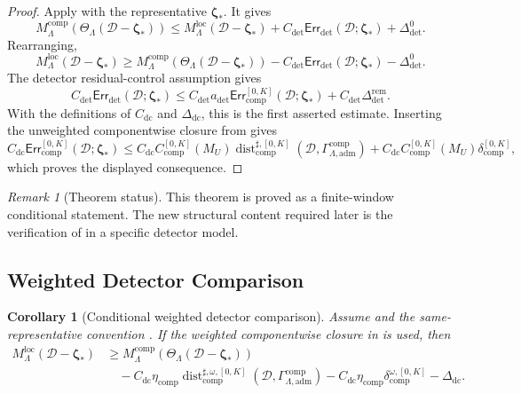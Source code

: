 \documentclass[11pt]{article}
\numberwithin{equation}{section}
\newtheorem{corollary}[corollary]{Corollary}
\theoremstyle{definition}
\theoremstyle{remark}
\newtheorem{remark}[remark]{Remark}
\newcommand{\loc}{\mathrm{loc}}
\newcommand{\adm}{\mathrm{adm}}
\newcommand{\comp}{\mathrm{comp}}
\newcommand{\detc}{\mathrm{det}}
\newcommand{\Err}{\mathsf{Err}}
\newcommand{\Dist}{\operatorname{dist}}
\newcommand{\calD}{\mathcal D}
\newcommand{\bzeta}{\boldsymbol\zeta}
\newcommand{\Gcomp}{\Gamma_{\Lambda,\adm}^{\comp}}
\begin{document}
\begin{proof}
Apply  with the representative \(\bzeta_*\).  It
gives
\[
    M_{\Lambda}^{\comp}(\Theta_{\Lambda}(\calD-\bzeta_*))
    \le
    M_{\Lambda}^{\loc}(\calD-\bzeta_*)
    +
    C_{\detc}\Err_{\detc}(\calD;\bzeta_*)
    +
    \Delta_{\detc}^{0}.
\]
Rearranging,
\[
    M_{\Lambda}^{\loc}(\calD-\bzeta_*)
    \ge
    M_{\Lambda}^{\comp}(\Theta_{\Lambda}(\calD-\bzeta_*))
    -
    C_{\detc}\Err_{\detc}(\calD;\bzeta_*)
    -
    \Delta_{\detc}^{0}.
\]
The detector residual-control assumption gives
\[
    C_{\detc}\Err_{\detc}(\calD;\bzeta_*)
    \le
    C_{\detc}a_{\detc}\Err_{\comp}^{[0,K]}(\calD;\bzeta_*)
    +
    C_{\detc}\Delta_{\detc}^{\mathrm{rem}}.
\]
With the definitions of \(C_{\mathrm{dc}}\) and \(\Delta_{\mathrm{dc}}\), this is
the first asserted estimate.  Inserting the unweighted componentwise closure
from  gives
\[
    C_{\mathrm{dc}}\Err_{\comp}^{[0,K]}(\calD;\bzeta_*)
    \le
    C_{\mathrm{dc}}C_{\comp}^{[0,K]}(M_U)
    \Dist_{\comp}^{\sharp,[0,K]}(\calD,\Gcomp)
    +
    C_{\mathrm{dc}}C_{\comp}^{[0,K]}(M_U)
    \delta_{\comp}^{[0,K]},
\]
which proves the displayed consequence.
\end{proof}

\begin{remark}[Theorem status]
This theorem is proved as a finite-window conditional statement.  The new
structural content required later is the verification of
 in a specific
detector model.
\end{remark}

\subsection{Weighted Detector Comparison}
\label{sec:weighted}

\begin{corollary}[Conditional weighted detector comparison]
\label{cor:weighted-detector}
Assume 
and the same-representative convention .  If the
weighted componentwise closure in  is used, then
\[
\begin{aligned}
    M_{\Lambda}^{\loc}(\calD-\bzeta_*)
    &\ge
    M_{\Lambda}^{\comp}(\Theta_{\Lambda}(\calD-\bzeta_*))\\
    &\quad-
    C_{\mathrm{dc}}\eta_{\comp}
    \Dist_{\comp}^{\sharp,\omega,[0,K]}(\calD,\Gcomp)
    -
    C_{\mathrm{dc}}\eta_{\comp}
    \delta_{\comp}^{\omega,[0,K]}
    -
    \Delta_{\mathrm{dc}}.
\end{aligned}
\]
\end{corollary}
\end{document}
